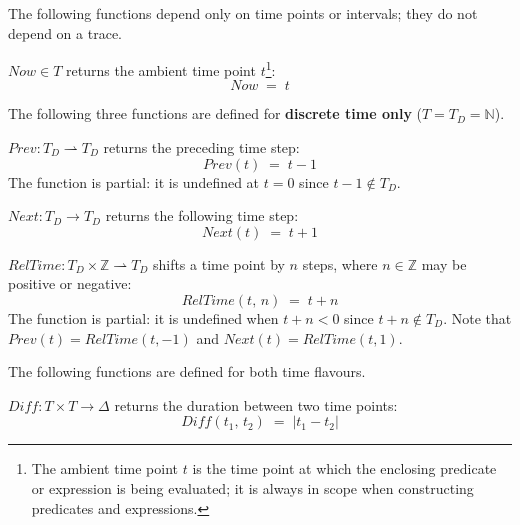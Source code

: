 The following functions depend only on time points or intervals; they do not depend on a trace.

\begin{definition}\label{def:now}
    $\mathit{Now} \in T$ returns the ambient time point $t$\footnote{The ambient time point $t$ is the time point at which the enclosing predicate or expression is being evaluated; it is always in scope when constructing predicates and expressions.}:
    \[
        \mathit{Now} \;=\; t
    \]
\end{definition}

The following three functions are defined for \textbf{discrete time only} ($T = T_D = \mathbb{N}$).

\begin{definition}[]\label{def:prev}
    $\mathit{Prev} : T_D \rightharpoonup T_D$ returns the preceding time step:
    \[
        \mathit{Prev}(t) \;=\; t - 1
    \]
    The function is partial: it is undefined at $t = 0$ since $t - 1 \notin T_D$.
\end{definition}

\begin{definition}[]\label{def:next}
    $\mathit{Next} : T_D \rightarrow T_D$ returns the following time step:
    \[
        \mathit{Next}(t) \;=\; t + 1
    \]
\end{definition}

\begin{definition}[]\label{def:reltime}
    $\mathit{RelTime} : T_D \times \mathbb{Z} \rightharpoonup T_D$ shifts a time point by $n$ steps, where $n \in \mathbb{Z}$ may be positive or negative:
    \[
        \mathit{RelTime}(t,\, n) \;=\; t + n
    \]
    The function is partial: it is undefined when $t + n < 0$ since $t + n \notin T_D$.
    Note that $\mathit{Prev}(t) = \mathit{RelTime}(t, -1)$ and $\mathit{Next}(t) = \mathit{RelTime}(t, 1)$.
\end{definition}

The following functions are defined for both time flavours.

\begin{definition}[]\label{def:diff}
    $\mathit{Diff} : T \times T \rightarrow \Delta$ returns the duration between two time points:
    \[
        \mathit{Diff}(t_1,\, t_2) \;=\; |t_1 - t_2|
    \]
\end{definition}

